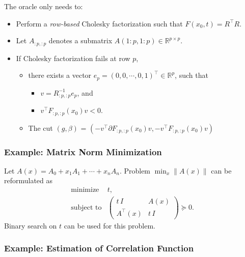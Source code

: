 \documentclass[final,leqno]{siamltex}
\providecommand{\tightlist}{%
  \setlength{\itemsep}{0pt}\setlength{\parskip}{0pt}}
\begin{document}
The oracle only needs to:

\begin{itemize}
\tightlist
\item
  Perform a \emph{row-based} Cholesky factorization such that
  \(F(x_0, t) = R^\top R\).
\item
  Let \(A_{:p,:p}\) denotes a submatrix
  \(A(1:p, 1:p) \in \mathbb{R}^{p\times p}\).
\item
  If Cholesky factorization fails at row \(p\),

  \begin{itemize}
  \tightlist
  \item
    there exists a vector
    \(e_p = (0, 0, \cdots, 0, 1)^\top \in \mathbb{R}^p\), such that

    \begin{itemize}
    \tightlist
    \item
      \(v = R_{:p,:p}^{-1} e_p\), and
    \item
      \(v^\top F_{:p,:p}(x_0) v < 0\).
    \end{itemize}
  \item
    The cut \((g, \beta)\) =
    \((-v^\top \partial F_{:p,:p}(x_0) v, -v^\top F_{:p,:p}(x_0) v)\)
  \end{itemize}
\end{itemize}

\hypertarget{sec:example-matrix-norm-minimization}{%
\subsubsection{Example: Matrix Norm Minimization}\label{sec:example-matrix-norm-minimization}}

Let \(A(x) = A_0 + x_1 A_1 + \cdots + x_n A_n\). Problem \(\min_x \| A(x) \|\) can be reformulated as
\[\begin{array}{ll}
    \text{minimize}      & t, \\
    \text{subject to}    & \left(
                            \begin{array}{cc}
                             t\,I   & A(x) \\
                             A^\top(x) & t\,I
                            \end{array} \right) \succeq 0.
  \end{array}
\]
Binary search on \(t\) can be used for this problem.

\hypertarget{sec:example-estimation-of-correlation-function}{%
\subsubsection{Example: Estimation of Correlation Function}\label{sec:example-estimation-of-correlation-function}}
\end{document}
